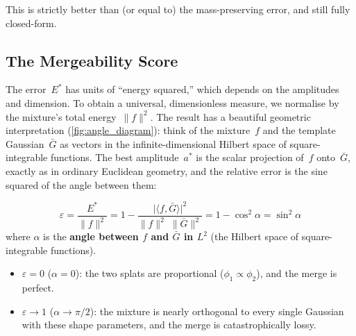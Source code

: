 \documentclass[11pt, a4paper]{article}
\theoremstyle{plain}
\theoremstyle{definition}
\theoremstyle{remark}
\begin{document}
This is strictly better than (or equal to) the mass-preserving
error, and still fully closed-form.

\subsection{The Mergeability Score}\label{ssec:mergeability}

The error~$E^*$ has units of ``energy squared,'' which depends on
the amplitudes and dimension.  To obtain a universal, dimensionless
measure, we normalise by the mixture's total energy~$\|f\|^2$.
The result has a beautiful geometric interpretation
(\cref{fig:angle_diagram}): think of the mixture~$f$ and the template
Gaussian~$\bar{G}$ as vectors in the infinite-dimensional Hilbert
space of square-integrable functions.  The best amplitude~$a^*$ is
the scalar projection of~$f$ onto~$\bar{G}$, exactly as in
ordinary Euclidean geometry, and the relative error is the sine
squared of the angle between them:

\begin{equation}\label{eq:mergeability}
\boxed{
  \varepsilon
  = \frac{E^*}{\|f\|^2}
  = 1 - \frac{\bigl|\langle f, \bar{G}\rangle\bigr|^2}
             {\|f\|^2\;\|\bar{G}\|^2}
  = 1 - \cos^2\!\alpha
  = \sin^2\!\alpha
}
\end{equation}
where $\alpha$ is the \textbf{angle between $f$ and $\bar{G}$ in
$L^2$} (the Hilbert space of square-integrable functions).

\begin{itemize}
\item $\varepsilon = 0$ ($\alpha = 0$): the two splats are
  proportional ($\phi_1 \propto \phi_2$), and the merge is perfect.
\item $\varepsilon \to 1$ ($\alpha \to \pi/2$): the mixture is
  nearly orthogonal to every single Gaussian with these shape
  parameters, and the merge is catastrophically lossy.
\end{itemize}
\end{document}
